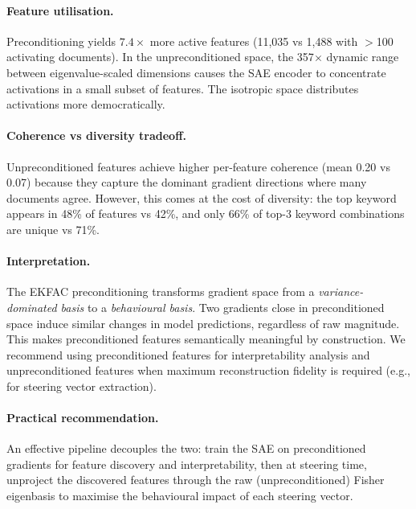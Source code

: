 \paragraph{Feature utilisation.} Preconditioning yields $7.4\times$ more active features (11{,}035 vs 1{,}488 with $>$100 activating documents). In the unpreconditioned space, the 357$\times$ dynamic range between eigenvalue-scaled dimensions causes the SAE encoder to concentrate activations in a small subset of features. The isotropic space distributes activations more democratically.

\paragraph{Coherence vs diversity tradeoff.} Unpreconditioned features achieve higher per-feature coherence (mean 0.20 vs 0.07) because they capture the dominant gradient directions where many documents agree. However, this comes at the cost of diversity: the top keyword appears in 48\% of features vs 42\%, and only 66\% of top-3 keyword combinations are unique vs 71\%.

\paragraph{Interpretation.} The EKFAC preconditioning transforms gradient space from a \emph{variance-dominated basis} to a \emph{behavioural basis}. Two gradients close in preconditioned space induce similar changes in model predictions, regardless of raw magnitude. This makes preconditioned features semantically meaningful by construction. We recommend using preconditioned features for interpretability analysis and unpreconditioned features when maximum reconstruction fidelity is required (e.g., for steering vector extraction).

\paragraph{Practical recommendation.} An effective pipeline decouples the two: train the SAE on preconditioned gradients for feature discovery and interpretability, then at steering time, unproject the discovered features through the raw (unpreconditioned) Fisher eigenbasis to maximise the behavioural impact of each steering vector.
